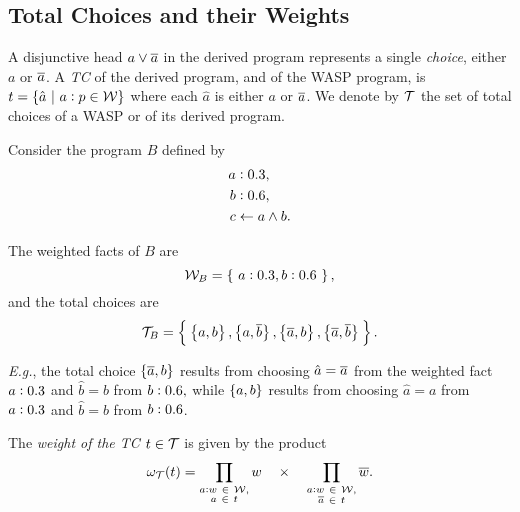 \documentclass[x11names]{tlp}
\begin{document}
\subsection*{Total Choices and their Weights}
\label{ssec:totalchoices.weights}

A disjunctive head $a \vee \overline{a}$ in the derived program represents a single \textit{choice}, either $a$ or $\overline{a}$.
A \textit{\acl{TC}} of the derived program, and of the \ac{WASP} program, is $t = \set{\hat{a} \ensuremath{~\middle|~}\ensuremath{a:p} \in \ensuremath{{\mathcal{W}}}}$ where each $\hat{a}$ is either $a$ or $\overline{a}$.
We denote by ${\mathcal{T}}$ the set of total choices of a \ac{WASP} or of its derived program.

\ifExamples
	\begin{example}
		\label{ex:total.choices}\em

		Consider the program $B$ defined by
		\begin{equation*}
			\begin{split}
				\weightfact{a & }{0.3},             %
				\\
				\weightfact{b & }{0.6},             %
				\\
				c           & \clause a \wedge b.
			\end{split}\label{eq:total.choices}
		\end{equation*}

		The weighted facts of $B$ are
		\[ {\mathcal{W}}_{B} = \set{~\ensuremath{a:0.3}, \ensuremath{b:0.6}~}, \]
		and the total choices are
		\begin{equation*}
			{\mathcal{T}}_{B} = \set[2]{\:
				\set[1]{a, b},
				\set[1]{a, \ensuremath{\overline{b}}},
				\set[1]{\ensuremath{\overline{a}}, b},
				\set[1]{\ensuremath{\overline{a}}, \ensuremath{\overline{b}}}\: }.
		\end{equation*}

		\emph{E.g.}, the total choice $\set{\ensuremath{\overline{a}}, b} $ results from choosing $\hat{a} = \overline{a}$ from the weighted fact $a:0.3$ and $\hat{b} = b$ from  $b:0.6, $ while $\set{a, b} $ results from choosing $\hat{a} = a$ from $a:0.3$ and $\hat{b} = b$ from $b:0.6$.

	\end{example}
\fi

The \emph{weight of the \acl{TC} $t \in {\mathcal{T}}$} is given by the product
\begin{equation}
	\wgtT\at{t} =
	\prod_{\substack{
			\weightfact{a}{w}~ \in ~\WEIGHTFset,%
	\\
			a~ \in~ t}} w\quad \times\quad
	\prod_{\substack{
			\weightfact{a}{w}~ \in ~\WEIGHTFset,%
	\\
			\co{a}~\in~ t}} \co{w}.
	\label{eq:weight.total.choice}
\end{equation}
\end{document}
